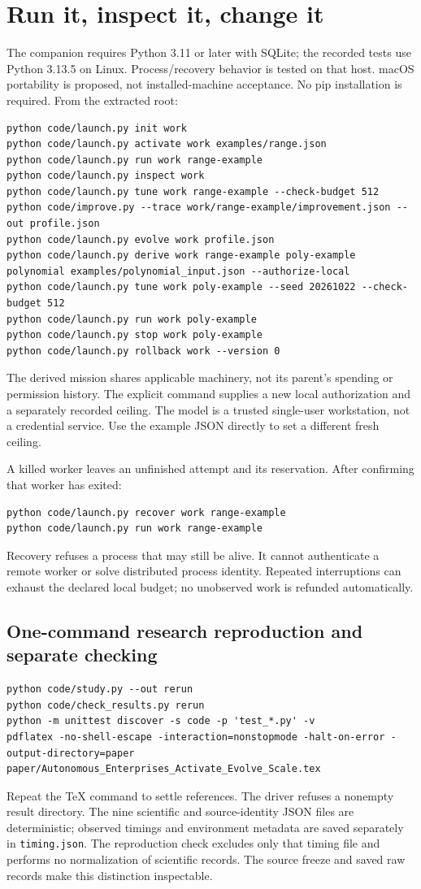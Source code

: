 \documentclass[11pt,letterpaper]{article}
\begin{document}
\section{Run it, inspect it, change it}
The companion requires Python 3.11 or later with SQLite; the recorded tests use Python 3.13.5 on Linux. Process/recovery behavior is tested on that host. macOS portability is proposed, not installed-machine acceptance. No pip installation is required. From the extracted root:
\begin{lstlisting}
python code/launch.py init work
python code/launch.py activate work examples/range.json
python code/launch.py run work range-example
python code/launch.py inspect work
python code/launch.py tune work range-example --check-budget 512
python code/improve.py --trace work/range-example/improvement.json --out profile.json
python code/launch.py evolve work profile.json
python code/launch.py derive work range-example poly-example polynomial examples/polynomial_input.json --authorize-local
python code/launch.py tune work poly-example --seed 20261022 --check-budget 512
python code/launch.py run work poly-example
python code/launch.py stop work poly-example
python code/launch.py rollback work --version 0
\end{lstlisting}
The derived mission shares applicable machinery, not its parent's spending or permission history. The explicit command supplies a new local authorization and a separately recorded ceiling. The model is a trusted single-user workstation, not a credential service. Use the example JSON directly to set a different fresh ceiling.

A killed worker leaves an unfinished attempt and its reservation. After confirming that worker has exited:
\begin{lstlisting}
python code/launch.py recover work range-example
python code/launch.py run work range-example
\end{lstlisting}
Recovery refuses a process that may still be alive. It cannot authenticate a remote worker or solve distributed process identity. Repeated interruptions can exhaust the declared local budget; no unobserved work is refunded automatically.

\subsection{One-command research reproduction and separate checking}
\begin{lstlisting}
python code/study.py --out rerun
python code/check_results.py rerun
python -m unittest discover -s code -p 'test_*.py' -v
pdflatex -no-shell-escape -interaction=nonstopmode -halt-on-error -output-directory=paper paper/Autonomous_Enterprises_Activate_Evolve_Scale.tex
\end{lstlisting}
Repeat the TeX command to settle references. The driver refuses a nonempty result directory. The nine scientific and source-identity JSON files are deterministic; observed timings and environment metadata are saved separately in \texttt{timing.json}. The reproduction check excludes only that timing file and performs no normalization of scientific records. The source freeze and saved raw records make this distinction inspectable.
\end{document}

